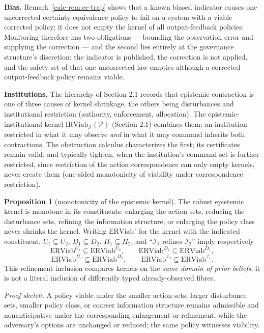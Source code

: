 \documentclass[10pt,twocolumn]{article}
\theoremstyle{definition}
\newtheorem{proposition}{Proposition}
\begin{document}
\textbf{Bias.} Remark~\ref{calc-rem:ce-trap} shows that a known biased indicator causes one uncorrected certainty-equivalence policy to fail on a system with a viable corrected policy; it does not empty the kernel of all output-feedback policies. Monitoring therefore has
two obligations --- bounding the observation error and supplying the
correction --- and the second lies entirely at the governance structure's discretion: the indicator is published, the correction is not applied,
and the safety set of that one uncorrected law empties although a corrected output-feedback policy remains viable.

\textbf{Institutions.} The hierarchy of Section 2.1 records that
epistemic contraction is one of three causes of kernel shrinkage, the
others being disturbances and institutional restriction (authority,
enforcement, allocation). The epistemic-institutional kernel \(\mathrm{IRViab}_{\mathcal{J}}(\mathcal{V})\) (Section 2.1) combines them: an institution restricted in what it
may observe \emph{and} in what it may command inherits both
contractions. The obstruction calculus characterizes the first; its certificates remain valid, and typically tighten, when the institution's command set is further restricted, since restriction of
the action correspondence can only empty kernels, never create them
(one-sided monotonicity of viability under correspondence restriction).

\begin{proposition}[monotonicity of the epistemic kernel]\label{calc-prop:monotone}
The robust epistemic kernel is monotone in its constituents: enlarging
the action sets, reducing the disturbance sets, refining the information
structure, or enlarging the policy class never shrinks the kernel.
Writing \(\mathrm{ERViab}^{\,\cdot}\) for the kernel with the indicated
constituent, \(U_1\subseteq U_2\), \(D_1\subseteq D_2\),
\(\Pi_1\subseteq\Pi_2\), and ``\(\mathcal{I}_1\) refines
\(\mathcal{I}_2\)'' imply respectively
\[\mathrm{ERViab}^{U_1} \subseteq \mathrm{ERViab}^{U_2}, \qquad
\mathrm{ERViab}^{D_2} \subseteq \mathrm{ERViab}^{D_1},\]
\[\mathrm{ERViab}^{\Pi_1} \subseteq \mathrm{ERViab}^{\Pi_2}, \qquad
\mathrm{ERViab}^{\mathcal{I}_2} \subseteq \mathrm{ERViab}^{\mathcal{I}_1}.\]
This refinement inclusion compares kernels on the \emph{same domain of prior beliefs}; it is not a literal inclusion of differently typed already-observed fibres.
\end{proposition}

\emph{Proof sketch.} A policy viable under the smaller action sets, larger disturbance sets, smaller policy class, or coarser information structure remains admissible and nonanticipative under the corresponding enlargement or refinement, while the adversary's options are unchanged or reduced; the same policy witnesses viability.
\end{document}
